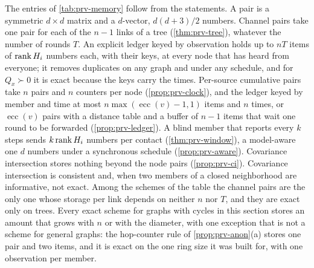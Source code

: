 \begin{remark}\label{rem:prv-memory}
The entries of \cref{tab:prv-memory} follow from the statements. A pair is a symmetric $d\times d$ matrix and a $d$-vector, $d(d+3)/2$ numbers. Channel pairs take one pair for each of the $n-1$ links of a tree (\cref{thm:prv-tree}), whatever the number of rounds $T$. An explicit ledger keyed by observation holds up to $nT$ items of $\operatorname{rank} H_i$ numbers each, with their keys, at every node that has heard from everyone; it removes duplicates on any graph and under any schedule, and for $Q_x\succ0$ it is exact because the keys carry the times. Per-source cumulative pairs take $n$ pairs and $n$ counters per node (\cref{prop:prv-clock}), and the ledger keyed by member and time at most $n\max(\operatorname{ecc}(v)-1,1)$ items and $n$ times, or $\operatorname{ecc}(v)$ pairs with a distance table and a buffer of $n-1$ items that wait one round to be forwarded (\cref{prop:prv-ledger}). A blind member that reports every $k$ steps sends $k\operatorname{rank} H_i$ numbers per contact (\cref{thm:prv-window}), a model-aware one $d$ numbers under a synchronous schedule (\cref{prop:prv-aware}). Covariance intersection stores nothing beyond the node pairs (\cref{prop:prv-ci}). Covariance intersection is consistent and, when two members of a closed neighborhood are informative, not exact. Among the schemes of the table the channel pairs are the only one whose storage per link depends on neither $n$ nor $T$, and they are exact only on trees. Every exact scheme for graphs with cycles in this section stores an amount that grows with $n$ or with the diameter, with one exception that is not a scheme for general graphs: the hop-counter rule of \cref{prop:prv-anon}(a) stores one pair and two items, and it is exact on the one ring size it was built for, with one observation per member.
\end{remark}
